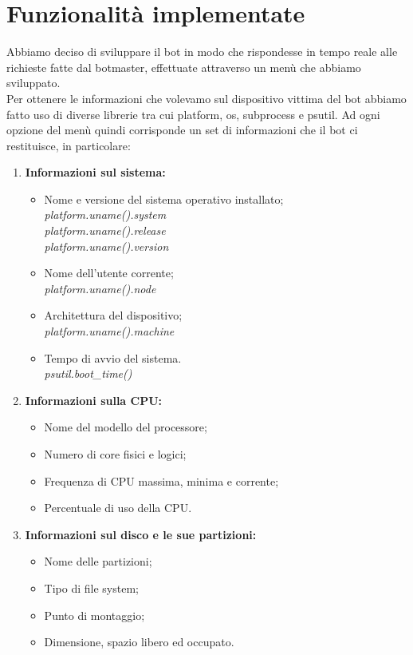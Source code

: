\documentclass[a4paper]{report}
\begin{document}
\section{Funzionalità implementate}
Abbiamo deciso di sviluppare il bot in modo che rispondesse in tempo reale alle richieste fatte dal botmaster, effettuate attraverso un menù che abbiamo sviluppato.\\
Per ottenere le informazioni che volevamo sul dispositivo vittima del bot abbiamo fatto uso di diverse librerie tra cui platform, os, subprocess e psutil.
Ad ogni opzione del menù quindi corrisponde un set di informazioni che il bot ci restituisce, in particolare:
\\
\begin{enumerate}
	
	\item \textbf{Informazioni sul sistema:}
	\begin{itemize}
		\item Nome e versione del sistema operativo installato;\textit{\\platform.uname().system\\platform.uname().release\\platform.uname().version}
		\item Nome dell'utente corrente;\textit{\\platform.uname().node}
		\item Architettura del dispositivo;\textit{\\platform.uname().machine}
		\item Tempo di avvio del sistema.\textit{\\psutil.boot\_time()}
	\end{itemize}
	
	\item \textbf{Informazioni sulla CPU:}
	\begin{itemize}
		\item Nome del modello del processore;
		\item Numero di core fisici e logici;
		\item Frequenza di CPU massima, minima e corrente;
		\item Percentuale di uso della CPU.
	\end{itemize}
	
	\item \textbf{Informazioni sul disco e le sue partizioni:}
	\begin{itemize}
		\item Nome delle partizioni;
		\item Tipo di file system;
		\item Punto di montaggio;
		\item Dimensione, spazio libero ed occupato.
	\end{itemize}
	

\end{enumerate}
\end{document}
